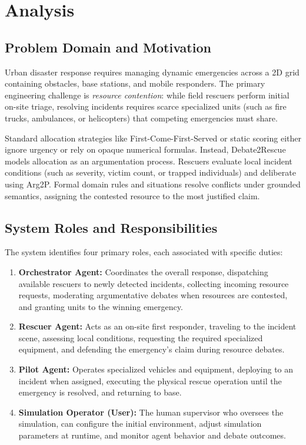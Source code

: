 \section{Analysis}
\label{sec:analysis}
\subsection{Problem Domain and Motivation}
\label{subsec:problem_domain}

Urban disaster response requires managing dynamic emergencies across a 2D grid containing obstacles, base stations, and mobile responders.
The primary engineering challenge is \emph{resource contention}: while field rescuers perform initial on-site triage, resolving incidents requires scarce specialized units (such as fire trucks, ambulances, or helicopters) that competing emergencies must share.

Standard allocation strategies like First-Come-First-Served or static scoring either ignore urgency or rely on opaque numerical formulas. Instead, Debate2Rescue models allocation as an argumentation process.
Rescuers evaluate local incident conditions (such as severity, victim count, or trapped individuals) and deliberate using Arg2P.
Formal domain rules and situations resolve conflicts under grounded semantics, assigning the contested resource to the most justified claim.

\subsection{System Roles and Responsibilities}
\label{subsec:system_roles}

The system identifies four primary roles, each associated with specific duties:

\begin{enumerate}
    \item \textbf{Orchestrator Agent:} Coordinates the overall response, dispatching available rescuers to newly detected incidents, collecting incoming resource requests, moderating argumentative debates when resources are contested, and granting units to the winning emergency.

    \item \textbf{Rescuer Agent:} Acts as an on-site first responder, traveling to the incident scene, assessing local conditions, requesting the required specialized equipment, and defending the emergency's claim during resource debates.

    \item \textbf{Pilot Agent:} Operates specialized vehicles and equipment, deploying to an incident when assigned, executing the physical rescue operation until the emergency is resolved, and returning to base.

    \item \textbf{Simulation Operator (User):} The human supervisor who oversees the simulation, can configure the initial environment, adjust simulation parameters at runtime, and monitor agent behavior and debate outcomes.
\end{enumerate}

